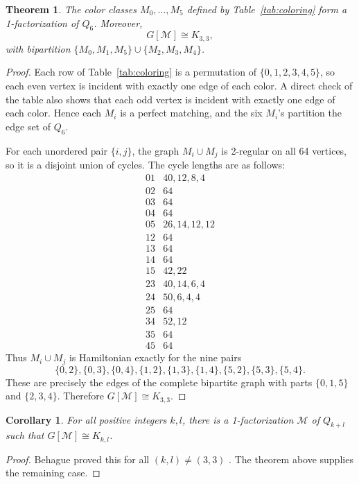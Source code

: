 \documentclass[11pt]{article}
\newtheorem{theorem}{Theorem}
\newtheorem{corollary}{Corollary}
\newcommand{\M}{\mathcal M}
\begin{document}
\begin{theorem}
The color classes \(M_0,\dots,M_5\) defined by Table~\ref{tab:coloring} form
a 1-factorization of \(Q_6\).  Moreover,
\[
  G[\M]\cong K_{3,3},
\]
with bipartition \(\{M_0,M_1,M_5\}\cup\{M_2,M_3,M_4\}\).
\end{theorem}

\begin{proof}
Each row of Table~\ref{tab:coloring} is a permutation of
\(\{0,1,2,3,4,5\}\), so each even vertex is incident with exactly one edge of
each color.  A direct check of the table also shows that each odd vertex is
incident with exactly one edge of each color.  Hence each \(M_i\) is a perfect
matching, and the six \(M_i\)'s partition the edge set of \(Q_6\).

For each unordered pair \(\{i,j\}\), the graph \(M_i\cup M_j\) is 2-regular
on all 64 vertices, so it is a disjoint union of cycles.  The cycle lengths are
as follows:
\[
\begin{array}{c|l}
01 & 40,12,8,4\\
02 & 64\\
03 & 64\\
04 & 64\\
05 & 26,14,12,12\\
12 & 64\\
13 & 64\\
14 & 64\\
15 & 42,22\\
23 & 40,14,6,4\\
24 & 50,6,4,4\\
25 & 64\\
34 & 52,12\\
35 & 64\\
45 & 64
\end{array}
\]
Thus \(M_i\cup M_j\) is Hamiltonian exactly for the nine pairs
\[
  \{0,2\},\{0,3\},\{0,4\},
  \{1,2\},\{1,3\},\{1,4\},
  \{5,2\},\{5,3\},\{5,4\}.
\]
These are precisely the edges of the complete bipartite graph with parts
\(\{0,1,5\}\) and \(\{2,3,4\}\).  Therefore \(G[\M]\cong K_{3,3}\).
\end{proof}

\begin{corollary}
For all positive integers \(k,l\), there is a 1-factorization \(\M\) of
\(Q_{k+l}\) such that \(G[\M]\cong K_{k,l}\).
\end{corollary}

\begin{proof}
Behague proved this for all \((k,l)\ne(3,3)\) \cite[Theorem 2]{behague}.  The
theorem above supplies the remaining case.
\end{proof}
\end{document}
